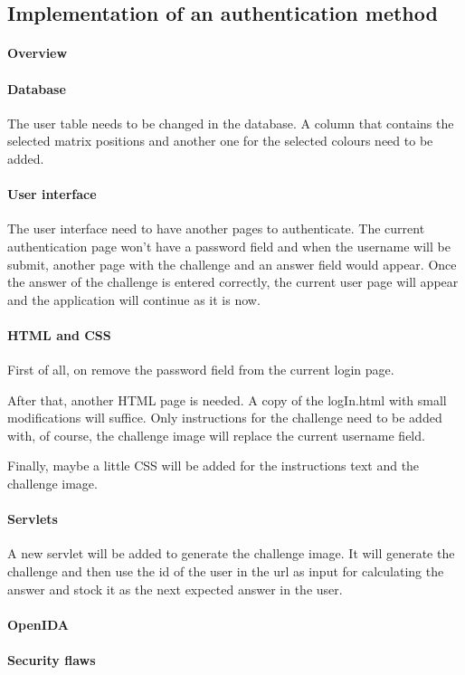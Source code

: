 \documentclass[11pt,a4paper]{article}
\begin{document}
\subsection*{Implementation of an authentication method}
\paragraph{Overview}

\paragraph{Database}
The user table needs to be changed in the database. A column that contains the selected matrix positions and another
one for the selected colours need to be added.

\paragraph{User interface}
The user interface need to have another pages to authenticate. The current authentication page won't have a password
field and when the username will be submit, another page with the challenge and an answer field would appear. Once the
answer of the challenge is entered correctly, the current user page will appear and the application will continue as it
is now.

\paragraph{HTML and CSS}
First of all, on remove the password field from the current login page.

After that, another HTML page is needed. A copy of the logIn.html with small modifications will suffice. Only
instructions for the challenge need to be added with, of course, the challenge image will replace the current username
field.

Finally, maybe a little CSS will be added for the instructions text and the challenge image.

\paragraph{Servlets}
A new servlet will be added to generate the challenge image. It will generate the challenge and then use the id of the user in the url as input for
calculating the answer and stock it as the next expected answer in the user.

\paragraph{OpenIDA}

\paragraph{Security flaws}
\end{document}
